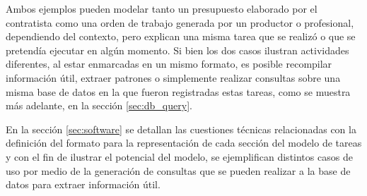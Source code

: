 Ambos ejemplos pueden modelar tanto un presupuesto elaborado por el contratista como una orden de trabajo generada por un productor o profesional, dependiendo del contexto, pero explican una misma tarea que se realizó o que se pretendía ejecutar en algún momento. Si bien los dos casos ilustran actividades diferentes, al estar enmarcadas en un mismo formato, es posible recompilar información útil, extraer patrones o simplemente realizar consultas sobre una misma base de datos en la que fueron registradas estas tareas, como se muestra más adelante, en la sección \ref{sec:db_query}.

En la sección \ref{sec:software} se detallan las cuestiones técnicas relacionadas con la definición del formato para la representación de cada sección del modelo de tareas y con el fin de ilustrar el potencial del modelo, se ejemplifican distintos casos de uso por medio de la generación de consultas que se pueden realizar a la base de datos para extraer información útil.